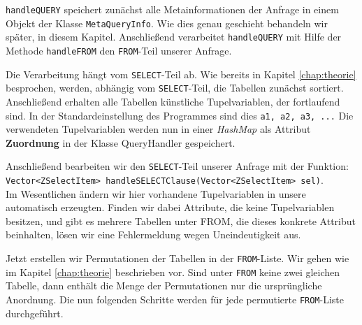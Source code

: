 \verb|handleQUERY| speichert zunächst alle Metainformationen der Anfrage in einem Objekt der Klasse \verb|MetaQueryInfo|. Wie dies genau geschieht behandeln wir später, in diesem Kapitel. Anschließend verarbeitet \verb|handleQUERY| mit Hilfe der Methode \verb|handleFROM| den \verb|FROM|-Teil unserer Anfrage. 

Die Verarbeitung hängt vom \verb|SELECT|-Teil ab. Wie bereits in Kapitel \ref{chap:theorie} besprochen, werden, abhängig vom \verb|SELECT|-Teil, die Tabellen zunächst sortiert. Anschließend erhalten alle Tabellen künstliche Tupelvariablen, der fortlaufend sind. In der Standardeinstellung des Programmes sind dies \verb|a1, a2, a3, ...| Die verwendeten Tupelvariablen werden nun in einer \textit{HashMap} als Attribut \textbf{Zuordnung} in der Klasse QueryHandler gespeichert. 

Anschließend bearbeiten wir den \verb|SELECT|-Teil unserer Anfrage mit der Funktion:\\
\verb|Vector<ZSelectItem> handleSELECTClause(Vector<ZSelectItem> sel)|.\\
Im Wesentlichen ändern wir hier vorhandene Tupelvariablen in unsere automatisch erzeugten. Finden wir dabei Attribute, die keine Tupelvariablen besitzen, und gibt es mehrere Tabellen unter FROM, die dieses konkrete Attribut beinhalten, lösen wir eine Fehlermeldung wegen Uneindeutigkeit aus. 

Jetzt erstellen wir Permutationen der Tabellen in der \verb|FROM|-Liste. Wir gehen wie im Kapitel \ref{chap:theorie} beschrieben vor. Sind unter \verb|FROM| keine zwei gleichen Tabelle, dann enthält die Menge der Permutationen nur die ursprüngliche Anordnung. Die nun folgenden Schritte werden für jede permutierte \verb|FROM|-Liste durchgeführt.

